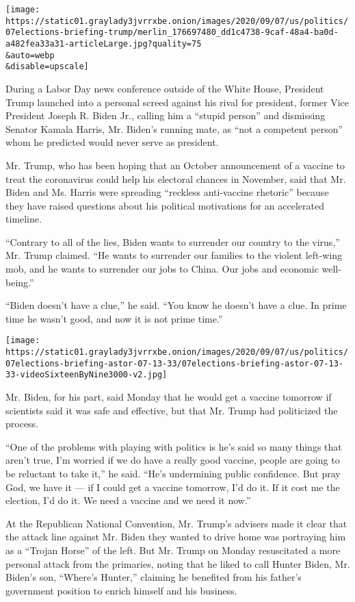 \texttt{[image: https://static01.graylady3jvrrxbe.onion/images/2020/09/07/us/politics/07elections-briefing-trump/merlin\_176697480\_dd1c4738-9caf-48a4-ba0d-a482fea33a31-articleLarge.jpg?quality=75\\\&auto=webp\\\&disable=upscale]}

During a Labor Day news conference outside of the White House, President
Trump launched into a personal screed against his rival for president,
former Vice President Joseph R. Biden Jr., calling him a ``stupid
person'' and dismissing Senator Kamala Harris, Mr. Biden's running mate,
as ``not a competent person'' whom he predicted would never serve as
president.

Mr. Trump, who has been hoping that an October announcement of a vaccine
to treat the coronavirus could help his electoral chances in November,
said that Mr. Biden and Ms. Harris were spreading ``reckless
anti-vaccine rhetoric'' because they have raised questions about his
political motivations for an accelerated timeline.

``Contrary to all of the lies, Biden wants to surrender our country to
the virus,'' Mr. Trump claimed. ``He wants to surrender our families to
the violent left-wing mob, and he wants to surrender our jobs to China.
Our jobs and economic well-being.''

``Biden doesn't have a clue,'' he said. ``You know he doesn't have a
clue. In prime time he wasn't good, and now it is not prime time.''

\texttt{[image: https://static01.graylady3jvrrxbe.onion/images/2020/09/07/us/politics/07elections-briefing-astor-07-13-33/07elections-briefing-astor-07-13-33-videoSixteenByNine3000-v2.jpg]}

Mr. Biden, for his part, said Monday that he would get a vaccine
tomorrow if scientists said it was safe and effective, but that Mr.
Trump had politicized the process.

``One of the problems with playing with politics is he's said so many
things that aren't true, I'm worried if we do have a really good
vaccine, people are going to be reluctant to take it,'' he said. ``He's
undermining public confidence. But pray God, we have it --- if I could
get a vaccine tomorrow, I'd do it. If it cost me the election, I'd do
it. We need a vaccine and we need it now.''

At the Republican National Convention, Mr. Trump's advisers made it
clear that the attack line against Mr. Biden they wanted to drive home
was portraying him as a ``Trojan Horse'' of the left. But Mr. Trump on
Monday resuscitated a more personal attack from the primaries, noting
that he liked to call Hunter Biden, Mr. Biden's son, ``Where's Hunter,''
claiming he benefited from his father's government position to enrich
himself and his business.

